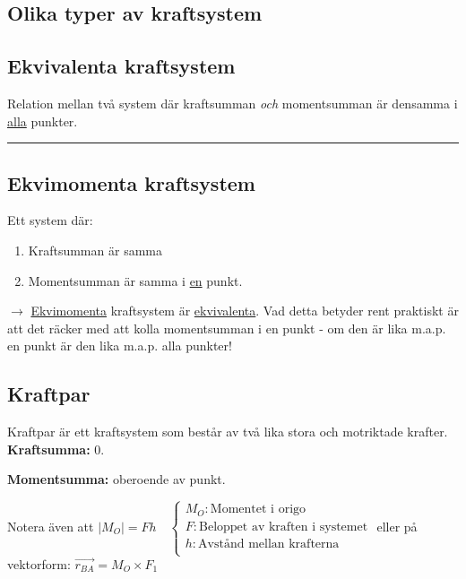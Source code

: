 \documentclass{article}
\newenvironment{ankiflashcard}[1]{}{}
\newcommand{\ruler}{
\rule{0.5\textwidth}{0.5pt}
}
\begin{document}
\begin{paracol}{2}
\section{Olika typer av kraftsystem}

\begin{ankiflashcard}{Vad är ekvivalenta kraftsystem? Vad kännetecknas de av?}
\subsection{Ekvivalenta kraftsystem}
Relation mellan två system där kraftsumman \textit{och} momentsumman är densamma i \underline{alla} punkter.
\ruler
\end{ankiflashcard}

\begin{ankiflashcard}{Vad är ekvimomenta kraftsystem? Vad kännetecknas de av?}
\subsection{Ekvimomenta kraftsystem}
Ett system där:
\begin{enumerate}
    \item Kraftsumman är samma
    \item Momentsumman är samma i \underline{en} punkt.
\end{enumerate}
$\rightarrow$ \underline{Ekvimomenta} kraftsystem är \underline{ekvivalenta}. Vad detta betyder rent praktiskt är att det räcker med att kolla momentsumman i en punkt - om den är lika m.a.p. en punkt är den lika m.a.p. alla punkter!
\end{ankiflashcard}

\begin{ankiflashcard}{Vad är ett kraftpar, och vad kännetecknar kraftparet?}
    
\subsection{Kraftpar}
Kraftpar är ett kraftsystem som består av två lika stora och motriktade krafter.
\textbf{Kraftsumma:} $0$.


\textbf{Momentsumma:} oberoende av punkt.


Notera även att $\left\lvert M_O \right\rvert = Fh\quad\left\{\begin{array}{l}M_O: \text{Momentet i origo} \\F: \text{Beloppet av kraften i systemet} \\h: \text{Avstånd mellan krafterna} \\\end{array}\right.$
eller på vektorform: $\vec{r_{BA}} = M_O \times F_1$
\end{ankiflashcard}


\end{paracol}
\end{document}
